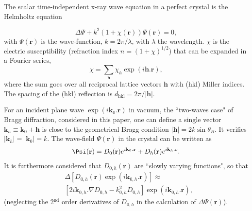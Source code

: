 \documentclass[preprint]{iucr}              %
\begin{document}
The scalar time-independent x-ray wave equation in a perfect crystal is the Helmholtz equation

\begin{equation}
\label{eq:helmholz}
    \Delta \Psi + k^2 (1+\chi(\textbf{r})) \Psi(\textbf{r}) = 0,
\end{equation}
with $\Psi(\textbf{r})$ is the wave-function, $k=2\pi/\lambda$, with $\lambda$ the wavelength. $\chi$ is the electric susceptibility (refraction index $n=(1+\chi)^{1/2}$) 
that can be expanded in a Fourier series,
\begin{equation}
\label{eq:chi}
    \chi = \sum_{\textbf{h}} \chi_h \exp(i \textbf{h} . \textbf{r}),
\end{equation}
where 
the sum goes over all reciprocal lattice vectors $\textbf{h}$ with (hkl) Miller indices. 
The spacing of the (hkl) reflection is $d_\text{hkl}=2 \pi/|\textbf{h}|$.

For an incident plane wave $\exp(i\textbf{k}_0 . \textbf{r})$ in vacuum, the ``two-waves case" of Bragg diffraction, considered in this paper, one can define a single vector $\textbf{k}_h \equiv \textbf{k}_0+\textbf{h}$ is close to the geometrical Bragg condition $|\textbf{h}|=2 k \sin\theta_B$. It verifies $|\textbf{k}_h|=|\textbf{k}_0| = k$.
The wave-field $\Psi(\textbf{r})$ in the crystal can be written as  
\begin{equation}
\label{eq:wavefield}
    \Psi(\textbf r) = D_0(\textbf r) e^{i \textbf k_0 . \textbf r} + D_h(\textbf r) e^{i \textbf k_h . \textbf r}.
\end{equation}
It is furthermore considered that $D_{0,h}(\textbf{r})$ are ``slowly varying functions", so that 
\begin{subequations}
\label{eq:approxslowlyvarying}
\begin{align}
&\Delta[D_{0,h}(\textbf{r}) \exp(i\textbf{k}_{0,h} . \textbf{r})] \approx \nonumber  \\
& [2 i \textbf{k}_{0,h} . \nabla D_{0,h} - k^2_{0,h} D_{0,h}] \exp(i\textbf{k}_{0,h} . \textbf{r}),
\end{align}
\end{subequations}
(neglecting the 2$^{\text{nd}}$ order derivatives of $D_{0,h}$ in the calculation of $\Delta \Psi(\textbf{r})$).
\end{document}
